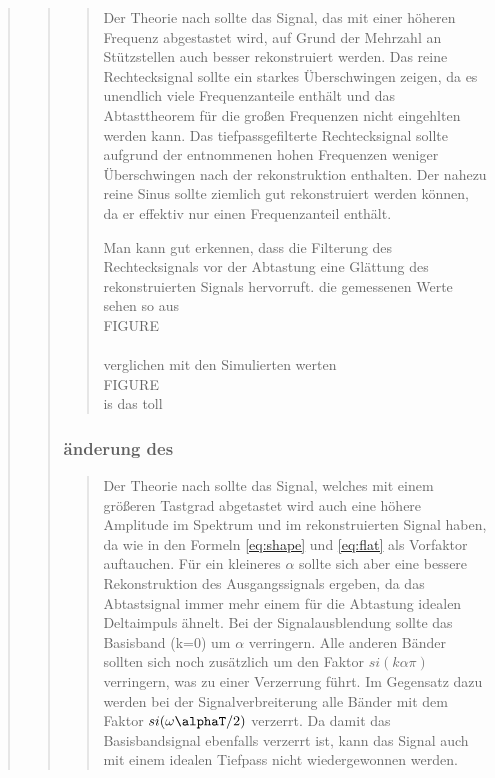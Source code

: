 \begin{quote}
\begin{quote}
\begin{quote}
            Der Theorie nach sollte das Signal, das mit einer höheren
            Frequenz abgestastet wird, auf Grund der Mehrzahl an Stützstellen
            auch besser rekonstruiert werden.
            Das reine Rechtecksignal sollte ein starkes Überschwingen zeigen, da
            es unendlich viele Frequenzanteile enthält und das Abtasttheorem für
            die großen Frequenzen nicht eingehlten werden kann.
            Das tiefpassgefilterte Rechtecksignal sollte aufgrund der
            entnommenen hohen Frequenzen weniger Überschwingen nach der rekonstruktion enthalten.
            Der nahezu reine Sinus sollte ziemlich gut rekonstruiert werden
            können, da er effektiv nur einen Frequenzanteil enthält.
            
            
            Man kann gut erkennen, dass die Filterung des Rechtecksignals vor
            der Abtastung eine Glättung des rekonstruierten Signals hervorruft.  
            die gemessenen Werte sehen so aus\\
            
            FIGURE\\
            \\
            
            
            verglichen mit den Simulierten werten\\
            
            FIGURE\\
            
            is das toll\\
        \end{quote}


        \subsubsection{änderung des \alpha }
        \begin{quote}
             
             Der Theorie nach sollte das Signal, welches mit einem größeren
             Tastgrad abgetastet wird auch eine höhere Amplitude im Spektrum und
             im rekonstruierten Signal haben, da wie in den Formeln
             \ref{eq:shape} und \ref{eq:flat} als Vorfaktor auftauchen. Für ein kleineres $\alpha$ sollte sich aber eine
             bessere Rekonstruktion des Ausgangssignals ergeben, da das
             Abtastsignal immer mehr einem für die Abtastung idealen
             Deltaimpuls ähnelt.
             Bei der Signalausblendung sollte das Basisband (k=0) um $\alpha$
             verringern. Alle anderen Bänder sollten sich noch zusätzlich um den
             Faktor $si(k\alpha\pi)$ verringern, was zu einer Verzerrung führt.
             Im Gegensatz dazu werden bei der Signalverbreiterung alle Bänder
             mit dem Faktor $si(\omega\alphaT/2)$ verzerrt. Da damit das
             Basisbandsignal ebenfalls verzerrt ist, kann das Signal auch mit
             einem idealen Tiefpass nicht wiedergewonnen werden.
             

\end{quote}
\end{quote}
\end{quote}
